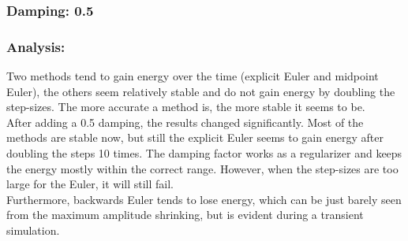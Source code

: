 \documentclass{article}
\begin{document}
\subsubsection{Damping: 0.5}

\subsubsection{Analysis:}
Two methods tend to gain energy over the time (explicit Euler and midpoint Euler), the others seem relatively stable and do not gain energy by doubling the step-sizes. The more accurate a method is, the more stable it seems to be. \\
After adding a 0.5 damping, the results changed significantly. Most of the methods are stable now, but still the explicit Euler seems to gain energy after doubling the steps 10 times. The damping factor works as a regularizer and keeps the energy mostly within the correct range. However, when the step-sizes are too large for the Euler, it will still fail. \\
Furthermore, backwards Euler tends to lose energy, which can be just barely seen from the maximum amplitude shrinking, but is evident during a transient simulation.
\end{document}
